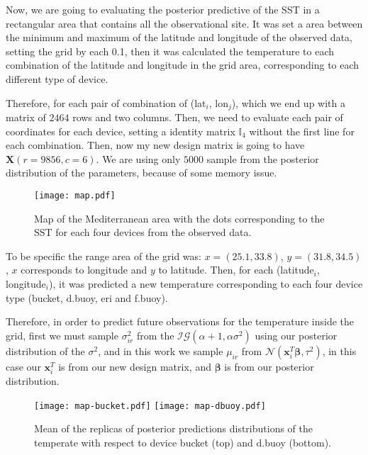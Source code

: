 \documentclass{asaproc}
\begin{document}
Now, we are going to evaluating the posterior predictive of the SST in a rectangular area that contains all the observational site. It was set a area between the minimum and maximum of the latitude and longitude of the observed data, setting the grid by each 0.1, then it was calculated the temperature to each combination of the latitude and longitude in the grid area, corresponding to each different type of device. 

Therefore, for each pair of combination of (lat$_i$, lon$_j$), which we end up with a matrix of $2464$ rows and two columns. Then, we need to evaluate each pair of coordinates for each device, setting a identity matrix $\mathds{I}_4$ without the first line for each combination. Then, now my new design matrix is going to have $\textbf{X}(r = 9856, c = 6)$. We are using only $5000$ sample from the posterior distribution of the parameters, because of some memory issue.  

\begin{figure}[H]
\centering
\texttt{[image: map.pdf]}
\caption{Map of the Mediterranean area with the dots corresponding to the SST for each four devices from the observed data.}
\label{maps}
\end{figure}

To be specific the range area of the grid was: $x=(25.1, 33.8)$, $y=(31.8, 34.5)$, $x$ corresponds to longitude and $y$ to latitude. Then, for each (latitude$_i$, longitude$_i$), it was predicted a new temperature corresponding to each four device type (bucket, d.buoy, eri and f.buoy). 

Therefore, in order to predict future observations for the temperature inside the grid, first we must sample $\sigma^2_{ir}$ from the $\mathcal{IG}(\alpha + 1, \alpha \sigma^2)$ using our posterior distribution of the $\sigma^2$, and in this work we sample $\mu_{ir}$ from $\mathcal{N}(\textbf{x}_i^T\boldsymbol{\beta}, \tau^2)$, in this case our $\textbf{x}_i^T$ is from our new design matrix, and $\boldsymbol{\beta}$ is from our posterior distribution. 

\begin{figure}[H]
\centering
\texttt{[image: map-bucket.pdf]}  
\texttt{[image: map-dbuoy.pdf]} 
\caption{Mean of the replicas of posterior predictions distributions of the temperate with respect to device bucket (top) and d.buoy (bottom).}
\label{maps-mean-1}
\end{figure}
\end{document}
